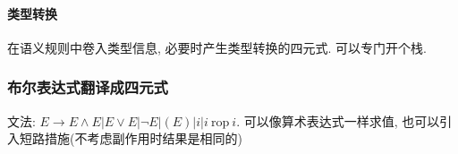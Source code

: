             \paragraph{类型转换}
                在语义规则中卷入类型信息, 必要时产生类型转换的四元式. 可以专门开个栈.

        \subsubsection{布尔表达式翻译成四元式}

            文法: $E\to E\wedge E|E\vee E|\neg E|(E)|i|i\mathrm{\ rop\ }i$. 可以像算术表达式一样求值, 也可以引入短路措施(不考虑副作用时结果是相同的)
